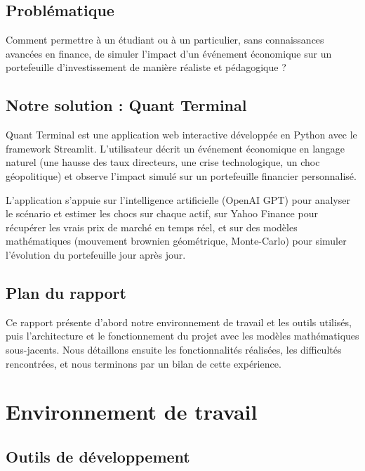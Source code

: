 \documentclass[a4paper, 12pt, twoside]{article}
\begin{document}
\subsection*{Problématique}

Comment permettre à un étudiant ou à un particulier, sans connaissances avancées en
finance, de simuler l'impact d'un événement économique sur un portefeuille
d'investissement de manière réaliste et pédagogique ?

\subsection*{Notre solution : Quant Terminal}

Quant Terminal est une application web interactive développée en Python avec le
framework Streamlit. L'utilisateur décrit un événement économique en langage naturel
(une hausse des taux directeurs, une crise technologique, un choc géopolitique) et
observe l'impact simulé sur un portefeuille financier personnalisé.

L'application s'appuie sur l'intelligence artificielle (OpenAI GPT) pour analyser le
scénario et estimer les chocs sur chaque actif, sur Yahoo Finance pour récupérer les
vrais prix de marché en temps réel, et sur des modèles mathématiques (mouvement
brownien géométrique, Monte-Carlo) pour simuler l'évolution du portefeuille jour
après jour.

\subsection*{Plan du rapport}

Ce rapport présente d'abord notre environnement de travail et les outils utilisés,
puis l'architecture et le fonctionnement du projet avec les modèles mathématiques
sous-jacents. Nous détaillons ensuite les fonctionnalités réalisées, les difficultés
rencontrées, et nous terminons par un bilan de cette expérience.

\newpage

\section{Environnement de travail}

\subsection{Outils de développement}
\end{document}
